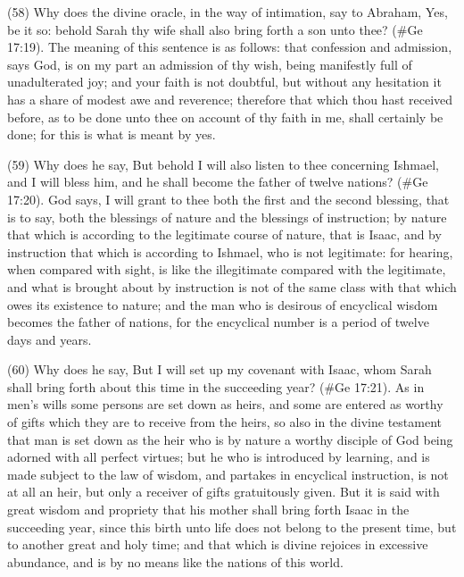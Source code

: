 (58) Why does the divine oracle, in the way of intimation, say to Abraham, Yes, be it so: behold
Sarah thy wife shall also bring forth a son unto thee? (\#Ge 17:19). The meaning of this
sentence is as follows: that confession and admission, says God, is on my part an admission of
thy wish, being manifestly full of unadulterated joy; and your faith is not doubtful, but without any
hesitation it has a share of modest awe and reverence; therefore that which thou hast received
before, as to be done unto thee on account of thy faith in me, shall certainly be done; for this is
what is meant by yes.

(59) Why does he say, But behold I will also listen to thee concerning Ishmael, and I will bless him,
and he shall become the father of twelve nations? (\#Ge 17:20). God says, I will grant to thee
both the first and the second blessing, that is to say, both the blessings of nature and the blessings
of instruction; by nature that which is according to the legitimate course of nature, that is Isaac,
and by instruction that which is according to Ishmael, who is not legitimate: for hearing, when
compared with sight, is like the illegitimate compared with the legitimate, and what is brought about
by instruction is not of the same class with that which owes its existence to nature; and the man
who is desirous of encyclical wisdom becomes the father of nations, for the encyclical number is a
period of twelve days and years.

(60) Why does he say, But I will set up my covenant with Isaac, whom Sarah shall bring forth about
this time in the succeeding year? (\#Ge 17:21). As in men's wills some persons are set down
as heirs, and some are entered as worthy of gifts which they are to receive from the heirs, so also
in the divine testament that man is set down as the heir who is by nature a worthy disciple of God
being adorned with all perfect virtues; but he who is introduced by learning, and is made subject to
the law of wisdom, and partakes in encyclical instruction, is not at all an heir, but only a receiver of
gifts gratuitously given. But it is said with great wisdom and propriety that his mother shall bring
forth Isaac in the succeeding year, since this birth unto life does not belong to the present time, but
to another great and holy time; and that which is divine rejoices in excessive abundance, and is by
no means like the nations of this world.

